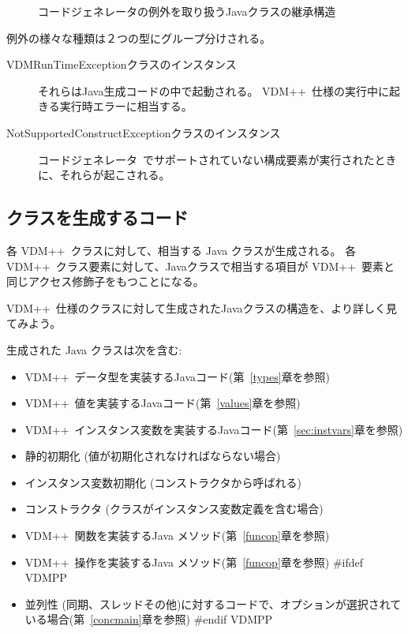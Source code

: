 \documentclass[\pformat,11pt]{jarticle}
\newcommand{\tcg}{コードジェネレータ}
\newcommand{\VDM}{VDM++}
\begin{document}
\begin{description}
\begin{figure}[tbh]
\begin{center}
\begin{picture}
\end{picture}
\caption{コードジェネレータの例外を取り扱うJavaクラスの継承構造\label{fig:exceptionclasses}}
\end{center}
\end{figure}

例外の様々な種類は２つの型にグループ分けされる。
\begin{description}

\item[VDMRunTimeExceptionクラスのインスタンス] それらはJava生成コードの中で起動される。 
 \VDM\ 仕様の実行中に起きる実行時エラーに相当する。  

\item[NotSupportedConstructExceptionクラスのインスタンス]
 \tcg\ でサポートされていない構成要素が実行されたときに、それらが起こされる。

\end{description}
\end{description}

\subsection{クラスを生成するコード}
\label{sec:classes}

各 \VDM\ クラスに対して、相当する Java クラスが生成される。
各 \VDM\ クラス要素に対して、Javaクラスで相当する項目が \VDM\ 要素と同じアクセス修飾子をもつことになる。

 \VDM\ 仕様のクラスに対して生成されたJavaクラスの構造を、より詳しく見てみよう。

生成された Java クラスは次を含む:

\begin{itemize}
\item \VDM\ データ型を実装するJavaコード(第~\ref{types}章を参照)
\item \VDM\ 値を実装するJavaコード(第~\ref{values}章を参照)
\item \VDM\ インスタンス変数を実装するJavaコード(第~\ref{sec:instvars}章を参照)
\item 静的初期化 (値が初期化されなければならない場合)
\item インスタンス変数初期化 (コンストラクタから呼ばれる)
\item コンストラクタ (クラスがインスタンス変数定義を含む場合)
\item \VDM\ 関数を実装するJava メソッド(第~\ref{funcop}章を参照)
\item \VDM\ 操作を実装するJava メソッド(第~\ref{funcop}章を参照)
#ifdef VDMPP
\item 並列性 (同期、スレッドその他)に対するコードで、オプションが選択されている場合(第~\ref{concmain}章を参照)
#endif VDMPP
\end{itemize}
\end{document}
